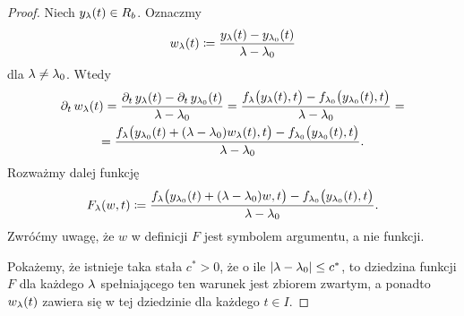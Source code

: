 \begin{proof}
  Niech $y_\l(t) \in R_b$. Oznaczmy
%
  \begin{equation*}
    w_\l(t) \coloneqq \frac{ y_\l(t) - y_{\l_0}(t) }{ \l - \l_0 }
  \end{equation*}
%
  dla $\l \ne \l_0$. Wtedy
%
  \begin{multline*}
    \pd{t} w_\l(t) = \frac{ \pd{t} y_\l(t) - \pd{t} y_{\l_0}(t) }{ \l - \l_0 } = \frac{ f_\l\p[\big]{y_\l(t), t} - 
    f_{\l_0} \p[\big]{y_{\l_0}(t), t} }{ \l - \l_0 } = \\
    =  \frac{ f_\l \p[\big]{y_{\l_0}(t) + (\l - \l_0)w_\l(t), t} - 
    f_{\l_0} \p[\big]{y_{\l_0}(t), t} }{ \l - \l_0 } .
  \end{multline*}
%
  Rozważmy dalej funkcję
%
  \begin{equation*}
    F_\l(w, t) \coloneqq \frac{ f_\l \p[\big]{y_{\l_0}(t) + (\l - \l_0)w, t} - 
      f_{\l_0}\p[\big]{y_{\l_0}(t), t} }{ \l - \l_0 }.
  \end{equation*}
%
  Zwróćmy uwagę, że $w$ w definicji $F$ jest symbolem argumentu, a nie funkcji.

  Pokażemy, że istnieje taka stała $c^* > 0$, że o ile $ \abs{ \l - \l_0} \le c^*$, to dziedzina funkcji $F$ dla 
  każdego $\l$ spełniającego ten warunek jest zbiorem zwartym, a ponadto $w_\l(t)$ zawiera się w tej dziedzinie dla 
  każdego $t \in I$. 


\end{proof}
